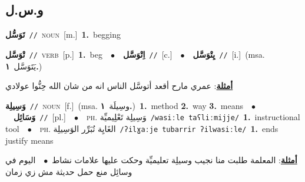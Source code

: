\documentclass[10pt,a4paper,twoside]{article} %
\begin{document}
\begin{multicols}{2}
\vspace{-3mm}
\subsection*{\color{blue}\foreignlanguage{arabic}{و.س.ل}\color{blue}{}} 

{\setlength\topsep{0pt}\textbf{\foreignlanguage{arabic}{تَوَسُّل}}\ {\color{gray}\texttt{//}\color{black}}\ \textsc{noun}\ [m.]\ \textbf{1.}~begging\ } \vspace{2mm}

{\setlength\topsep{0pt}\textbf{\foreignlanguage{arabic}{تْوَسَّل}}\ {\color{gray}\texttt{//}\color{black}}\ \textsc{verb}\ [p.]\ \textbf{1.}~beg\ \ $\bullet$\ \ \setlength\topsep{0pt}\textbf{\foreignlanguage{arabic}{اِتْوَسَّل}}\ {\color{gray}\texttt{//}\color{black}}\ [c.]\ \ $\bullet$\ \ \setlength\topsep{0pt}\textbf{\foreignlanguage{arabic}{يِتْوَسَّل}}\ {\color{gray}\texttt{//}\color{black}}\ [i.]\ \color{gray}(msa. \foreignlanguage{arabic}{يَتَوَسَّل}~\foreignlanguage{arabic}{\textbf{١.}})\color{black}\  \begin{flushright}\color{gray}\foreignlanguage{arabic}{\textbf{\underline{\foreignlanguage{arabic}{أمثلة}}}: عمري مارح أقعد أتوسَّل الناس انه من شان الله حِنُّوا عولادي}\end{flushright}\color{black}} \vspace{2mm}

{\setlength\topsep{0pt}\textbf{\foreignlanguage{arabic}{وَسِيلِة}}\ {\color{gray}\texttt{//}\color{black}}\ \textsc{noun}\ [f.]\ \color{gray}(msa. \foreignlanguage{arabic}{وسِيلَة}~\foreignlanguage{arabic}{\textbf{١.}})\color{black}\ \textbf{1.}~method  \textbf{2.}~way  \textbf{3.}~means\ \ $\bullet$\ \ \setlength\topsep{0pt}\textbf{\foreignlanguage{arabic}{وَسَائِل}}\ {\color{gray}\texttt{//}\color{black}}\ [pl.]\ \ $\bullet$\ \ \textsc{ph.} \color{gray} \foreignlanguage{arabic}{وَسِيلِة تَعْلِيميِّة}\color{black}\ {\color{gray}\texttt{/{\sffamily wasiːle taʕliːmijje}/}\color{black}}\ \textbf{1.}~instructional tool\ \ $\bullet$\ \ \textsc{ph.} \color{gray} \foreignlanguage{arabic}{الغَايِة تُبَرِّر الوَسِيلِة}\color{black}\ {\color{gray}\texttt{/{\sffamily ʔilɣaːje tubarrir ʔilwasiːle}/}\color{black}}\ \textbf{1.}~ends justify means\  \begin{flushright}\color{gray}\foreignlanguage{arabic}{\textbf{\underline{\foreignlanguage{arabic}{أمثلة}}}: المعلمة طلبت منا نجيب وسيلِة تعليميِّة وحكت عليها علامات نشاط\ $\bullet$\ \  اليوم في وسائِل منع حمل حديثة مش زي زمان}\end{flushright}\color{black}} \vspace{2mm}


\end{multicols}
\end{document}
